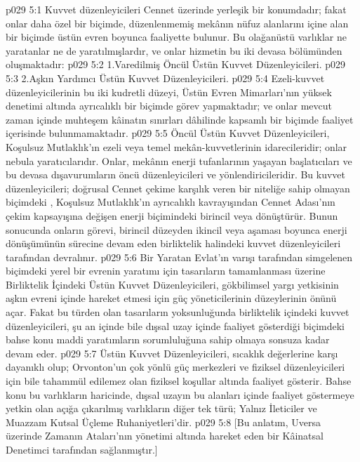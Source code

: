 \vs p029 5:1 Kuvvet düzenleyicileri Cennet üzerinde yerleşik bir konumdadır; fakat onlar daha özel bir biçimde, düzenlenmemiş mekânın nüfuz alanlarını içine alan bir biçimde üstün evren boyunca faaliyette bulunur. Bu olağanüstü varlıklar ne yaratanlar ne de yaratılmışlardır, ve onlar hizmetin bu iki devasa bölümünden oluşmaktadır:
\vs p029 5:2 1.\bibnobreakspace Varedilmiş Öncül Üstün Kuvvet Düzenleyicileri.
\vs p029 5:3 2.\bibnobreakspace Aşkın Yardımcı Üstün Kuvvet Düzenleyicileri.
\vs p029 5:4 Ezeli\hyp{}kuvvet düzenleyicilerinin bu iki kudretli düzeyi, Üstün Evren Mimarları’nın yüksek denetimi altında ayrıcalıklı bir biçimde görev yapmaktadır; ve onlar mevcut zaman içinde muhteşem kâinatın sınırları dâhilinde kapsamlı bir biçimde faaliyet içerisinde bulunmamaktadır.
\vs p029 5:5 Öncül Üstün Kuvvet Düzenleyicileri, Koşulsuz Mutlaklık’ın ezeli veya temel mekân\hyp{}kuvvetlerinin idarecileridir; onlar nebula yaratıcılarıdır. Onlar, mekânın enerji tufanlarının yaşayan başlatıcıları ve bu devasa dışavurumların öncü düzenleyicileri ve yönlendiricileridir. Bu kuvvet düzenleyicileri; doğrusal Cennet çekime karşılık veren bir niteliğe sahip olmayan biçimdeki , Koşulsuz Mutlaklık’ın ayrıcalıklı kavrayışından Cennet Adası’nın çekim kapsayışına değişen enerji biçimindeki birincil veya  dönüştürür. Bunun sonucunda onların görevi, birincil düzeyden ikincil veya  aşaması boyunca enerji dönüşümünün sürecine devam eden birliktelik halindeki kuvvet düzenleyicileri tarafından devralınır.
\vs p029 5:6 Bir Yaratan Evlat’ın varışı tarafından simgelenen biçimdeki yerel bir evrenin yaratımı için tasarıların tamamlanması üzerine Birliktelik İçindeki Üstün Kuvvet Düzenleyicileri, gökbilimsel yargı yetkisinin aşkın evreni içinde hareket etmesi için güç yöneticilerinin düzeylerinin önünü açar. Fakat bu türden olan tasarıların yoksunluğunda birliktelik içindeki kuvvet düzenleyicileri, şu an içinde bile dışsal uzay içinde faaliyet gösterdiği biçimdeki bahse konu maddi yaratımların sorumluluğuna sahip olmaya sonsuza kadar devam eder.
\vs p029 5:7 Üstün Kuvvet Düzenleyicileri, sıcaklık değerlerine karşı dayanıklı olup; Orvonton’un çok yönlü güç merkezleri ve fiziksel düzenleyicileri için bile tahammül edilemez olan fiziksel koşullar altında faaliyet gösterir. Bahse konu bu varlıkların haricinde, dışsal uzayın bu alanları içinde faaliyet göstermeye yetkin olan açığa çıkarılmış varlıkların diğer tek türü; Yalnız İleticiler ve Muazzam Kutsal Üçleme Ruhaniyetleri’dir.
\vs p029 5:8 [Bu anlatım, Uversa üzerinde Zamanın Ataları’nın yönetimi altında hareket eden bir Kâinatsal Denetimci tarafından sağlanmıştır.]

